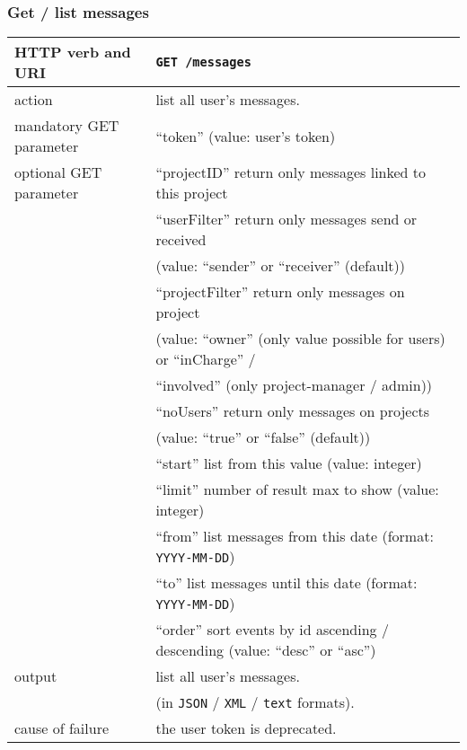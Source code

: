 \subsubsection{Get / list messages}
\begin{tabular}{ | l | l | }
	\hline
	HTTP verb and URI & \texttt{GET /messages} \\
	\hline
	action & list all user's messages. \\
	\hline
	mandatory GET parameter & ``token'' (value: user's token) \\
	\hline
	optional GET parameter & ``projectID'' return only messages linked to this project \\
	\space & ``userFilter'' return only messages send or received \\ 
	\space & (value: ``sender'' or ``receiver'' (default)) \\
	\space & ``projectFilter'' return only messages on project \\
	\space & (value: ``owner'' (only value possible for users) or ``inCharge'' / \\
	\space & ``involved'' (only project-manager / admin)) \\
	\space & ``noUsers'' return only messages on projects \\ 
	\space & (value: ``true'' or ``false'' (default)) \\
	\space & ``start'' list from this value (value: integer) \\
	\space & ``limit'' number of result max to show (value: integer) \\
	\space & ``from'' list messages from this date (format: \texttt{YYYY-MM-DD}) \\
	\space & ``to'' list messages until this date (format: \texttt{YYYY-MM-DD}) \\
	\space & ``order'' sort events by id ascending / descending (value: ``desc'' or ``asc'')  \\
	\hline
	output & list all user's messages.  \\
	\space & (in \texttt{JSON} / \texttt{XML} / \texttt{text} formats). \\
	\hline
	cause of failure & the user token is deprecated. \\
	\hline
\end{tabular}
\newline

